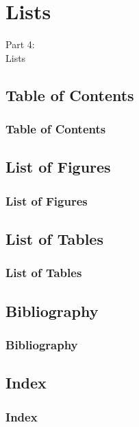 {
\renewcommand{\bgcolor}{lists}

\section{Lists}
\begin{frame}
  \vspace{25mm}
  \begin{center}
    \Huge{Part 4:\\Lists}
  \end{center}
\end{frame}

\subsection{Table of Contents}
\begin{frame}[fragile]
  \frametitle{Table of Contents}
  \vspace{3mm}
  
\end{frame}

\subsection{List of Figures}
\begin{frame}[fragile]
  \frametitle{List of Figures}
  \vspace{3mm}
  
\end{frame}

\subsection{List of Tables}
\begin{frame}[fragile]
  \frametitle{List of Tables}
  \vspace{3mm}
  
\end{frame}

\subsection{Bibliography}
\begin{frame}[fragile]
  \frametitle{Bibliography}
  \vspace{3mm}
  
\end{frame}

\subsection{Index}
\begin{frame}[fragile]
  \frametitle{Index}
  \vspace{3mm}
  
\end{frame}

}

